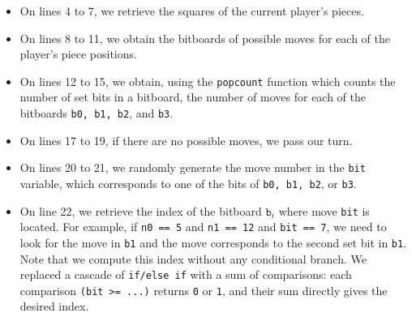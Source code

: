 \documentclass[12pt,a4paper,twoside,openright]{book}
\begin{document}
\begin{itemize}
\item On lines 4 to 7, we retrieve the squares of the current player's pieces.
\item On lines 8 to 11, we obtain the bitboards of possible moves for each of the player's piece positions.
\item On lines 12 to 15, we obtain, using the \texttt{popcount} function which counts the number of set bits in a bitboard, the number of moves for each of the bitboards \texttt{b0, b1, b2}, and \texttt{b3}.
\item On lines 17 to 19, if there are no possible moves, we pass our turn.
\item On lines 20 to 21, we randomly generate the move number in the \texttt{bit} variable, which corresponds to one of the bits of \texttt{b0, b1, b2}, or \texttt{b3}.
\item On line 22, we retrieve the index of the bitboard ${\texttt b}_i$ where move \texttt{bit} is located. For example, if \texttt{n0 == 5} and \texttt{n1 == 12} and \texttt{bit == 7}, we need to look for the move in \texttt{b1} and the move corresponds to the second set bit in \texttt{b1}. Note that we compute this index without any conditional branch. We replaced a cascade of \texttt{if/else if} with a sum of comparisons: each comparison \texttt{(bit >= ...)} returns \texttt{0} or \texttt{1}, and their sum directly gives the desired index.

\end{itemize}
\end{document}
